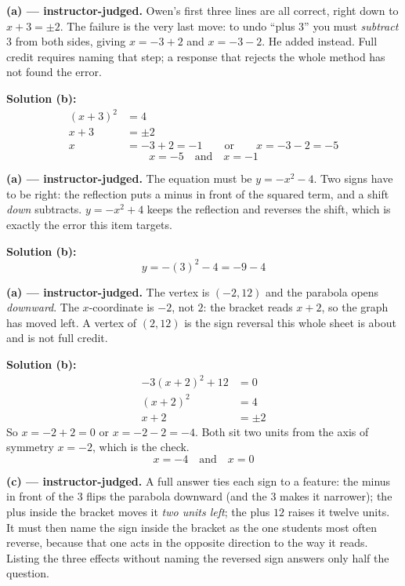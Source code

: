 \documentclass[12pt]{article}
\begin{document}
\textbf{(a) --- instructor-judged.} Owen's first three lines are all correct, right down to $x + 3 = \pm 2$. The failure is the very last move: to undo ``plus $3$'' you must \emph{subtract} $3$ from both sides, giving $x = -3 + 2$ and $x = -3 - 2$. He added instead. Full credit requires naming that step; a response that rejects the whole method has not found the error.

\textbf{Solution (b):}
\begin{align*}
  (x+3)^2 &= 4 \\
  x + 3 &= \pm 2 \\
  x &= -3 + 2 = -1 \qquad \text{or} \qquad x = -3 - 2 = -5
\end{align*}
\[ \boxed{x = -5 \quad \text{and} \quad x = -1} \]


\textbf{(a) --- instructor-judged.} The equation must be $y = -x^2 - 4$. Two signs have to be right: the reflection puts a minus in front of the squared term, and a shift \emph{down} subtracts. $y = -x^2 + 4$ keeps the reflection and reverses the shift, which is exactly the error this item targets.

\textbf{Solution (b):}
\[ y = -(3)^2 - 4 = -9 - 4 \]


\textbf{(a) --- instructor-judged.} The vertex is $(-2, 12)$ and the parabola opens \emph{downward}. The $x$-coordinate is $-2$, not $2$: the bracket reads $x + 2$, so the graph has moved left. A vertex of $(2, 12)$ is the sign reversal this whole sheet is about and is not full credit.

\textbf{Solution (b):}
\begin{align*}
  -3(x+2)^2 + 12 &= 0 \\
  (x+2)^2 &= 4 \\
  x + 2 &= \pm 2
\end{align*}
So $x = -2 + 2 = 0$ or $x = -2 - 2 = -4$. Both sit two units from the axis of symmetry $x = -2$, which is the check.
\[ \boxed{x = -4 \quad \text{and} \quad x = 0} \]

\textbf{(c) --- instructor-judged.} A full answer ties each sign to a feature: the minus in front of the $3$ flips the parabola downward (and the $3$ makes it narrower); the plus inside the bracket moves it \emph{two units left}; the plus $12$ raises it twelve units. It must then name the sign inside the bracket as the one students most often reverse, because that one acts in the opposite direction to the way it reads. Listing the three effects without naming the reversed sign answers only half the question.
\end{document}

